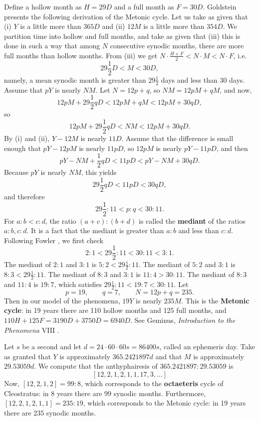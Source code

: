 \documentclass{article}
\begin{document}
Define a hollow month as $H=29D$ and a full month  as $F=30D$. 
Goldstein \cite{goldstein} presents the following derivation of  the Metonic cycle.
Let us take as given that
(i) $Y$ is a little more than $365 D$ and  (ii) $12 M$ is a little more than $354 D$. We partition time into
hollow and full months, and take as given that (iii) this is done in such a way that among $N$ consecutive synodic months, there are more
full months than hollow months.
From (iii) we get $N \cdot \frac{H+F}{2} < N\cdot M < N \cdot F$, i.e.
\[
29 \frac{1}{2}  D< M < 30D,
\]
namely, a mean synodic month is greater than $29\frac{1}{2}$ days and less than 30 days. 
Assume that $pY$ is nearly $NM$.
Let $N=12 p + q$, so
$N  M = 12pM + qM$, and
now,
\[
12pM+29 \frac{1}{2} qD <12pM+ qM < 12pM+30qD,
\]
so 
\[
12pM+29 \frac{1}{2} qD  < NM < 12pM +30qD.
\]
By (i) and (ii), $Y-12M$ is nearly $11D$. Assume that the difference is small enough that
$pY-12pM$ is nearly $11pD$, so $12pM$ is nearly $pY-11pD$, and then 
\[
pY -NM+  \frac{1}{2} qD < 11pD <  pY -NM+ 30qD.
\]
Because $pY$ is nearly $NM$, this yields
\[
29 \frac{1}{2} qD < 11pD < 30qD,
\]
and therefore
\[
29 \frac{1}{2} : 11 < p:q < 30:11.
\]
For $a:b < c:d$, the ratio $(a+c):(b+d)$ is called the \textbf{mediant} of the ratios $a:b, c:d$. 
It is a fact that the mediant is greater than $a:b$ and less than $c:d$. 
Following Fowler \cite[pp.~42--43]{fowler},
we first check
\[
2:1< 29 \frac{1}{2} : 11  < 30:11 < 3:1.
\]
The mediant of $2:1$ and $3:1$ is $5:2<29 \frac{1}{2} : 11$. 
The mediant of $5:2$ and $3:1$ is $8:3<29 \frac{1}{2} : 11$. 
The mediant of $8:3$ and $3:1$ is $11:4>30:11$. 
The mediant of $8:3$ and $11:4$ is $19:7$, which satisfies $29 \frac{1}{2}:11 < 19:7 < 30:11$. 
Let
\[
p=19,\qquad q=7,\qquad N = 12p+q = 235.
\]
Then in our model of the phenomena, $19Y$ is nearly $235M$. 
This is the \textbf{Metonic cycle}: in 19 years there are 110 hollow months and 125 full months,
and $110H+125F = 3190D + 3750D = 6940D$.
See Geminus, {\em Introduction to the Phenomena} VIII \cite{geminus}.


Let $s$ be a second and
let $d=24 \cdot 60 \cdot 60 s =  86400s$, called an ephemeris day. 
Take as granted that $Y$ is approximately $365.2421897d$ and that $M$ is approximately
$29.53059d$. We compute that the anthyphairesis of $365.2421897:29.53059$ is
\[
[12,2,1,2,1,1,17,3,\ldots]
\]
Now, $[12,2,1,2] =99:8$,
which corresponds to the \textbf{octaeteris} cycle of Cleostratus: in $8$ years there are 99 synodic months.
Furthermore, $[12,2,1,2,1,1] = 235:19$, which corresponds to the Metonic cycle: in 19 years there
are 235 synodic months.  
\end{document}
